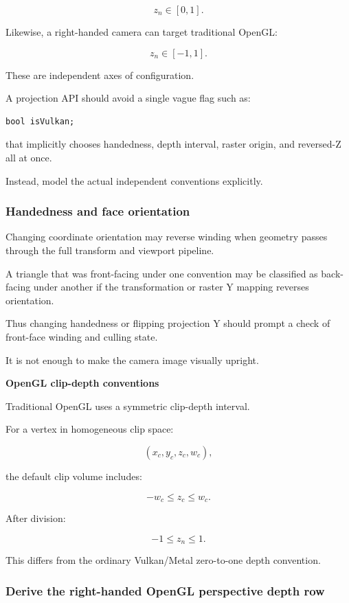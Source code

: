 \[
 z_n\in[0,1].
\]

Likewise, a right-handed camera can target traditional OpenGL:

\[
 z_n\in[-1,1].
\]

These are independent axes of configuration.

A projection API should avoid a single vague flag such as:

\begin{verbatim}
bool isVulkan;
\end{verbatim}

that implicitly chooses handedness, depth interval, raster origin, and reversed-Z all at once.

Instead, model the actual independent conventions explicitly.

\subsubsection{Handedness and face orientation}\label{handedness-and-face-orientation}

Changing coordinate orientation may reverse winding when geometry passes through the full transform and viewport pipeline.

A triangle that was front-facing under one convention may be classified as back-facing under another if the transformation or raster Y mapping reverses orientation.

Thus changing handedness or flipping projection Y should prompt a check of front-face winding and culling state.

It is not enough to make the camera image visually upright.

\textbf{OpenGL clip-depth conventions}

Traditional OpenGL uses a symmetric clip-depth interval.

For a vertex in homogeneous clip space:

\[
 (x_c,y_c,z_c,w_c),
\]

the default clip volume includes:

\[
 \boxed{-w_c\le z_c\le w_c}.
\]

After division:

\[
 \boxed{-1\le z_n\le1}.
\]

This differs from the ordinary Vulkan/Metal zero-to-one depth convention.

\subsubsection{Derive the right-handed OpenGL perspective depth row}\label{derive-the-right-handed-opengl-perspective-depth-row}

